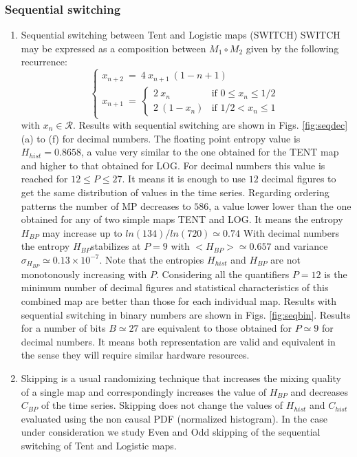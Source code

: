 \subsubsection{Sequential switching}
\begin{enumerate}
\item Sequential switching between Tent and Logistic maps (SWITCH)
SWITCH may be expressed as a composition between $M_1 \circ M_2$ given by the following recurrence:
%
\[ \left\{ \begin{array}{ccc}\label{eq:seq}
x_{n+2}~=~ 4~x_{n+1}~(1-{n+1}) \\
x_{n+1}~=~ \left\{ \begin{array}{ll}
2~{x_n} & \textrm{if $0\leq x_n\leq 1/2$}\\
2~(1-{x_n}) & \textrm{if $1/2<x_n\leq 1$} 
\end{array} \right.  \end{array}\right. \] 
with $x_n\in\mathcal{R}$.
%
Results with sequential switching are shown in Figs. \ref{fig:seqdec} (a) to (f) for decimal numbers. The floating point entropy value is $H_{hist}=0.8658$, a value very similar to the one obtained for the TENT map and higher to that obtained for LOG. For decimal numbers this value is reached for $12 \leq P \leq 27$. It means it is enough to use $12$ decimal figures to get the same distribution of values in the time series. Regarding ordering patterns the number of MP decreases to $586$, a value lower lower than the one obtained for any of two simple maps TENT and LOG. It means the entropy $H_{BP}$ may increase up to $ln(134)/ln(720)\simeq 0.74$ With decimal numbers the entropy $H_{BP} $stabilizes at $P=9$ with $<H_{BP}>\simeq 0.657$ and variance $\sigma_{H_{BP}} \simeq 0.13 \times 10^{-7}$. Note that the entropies $H_{hist}$ and $H_{BP}$ are not monotonously increasing with $P$.  Considering all the quantifiers $P=12$ is the minimum number of decimal figures and statistical characteristics of this combined map are better than those for each individual map.
%
Results with sequential switching in binary numbers are shown in Figs. \ref{fig:seqbin}. Results for a number of bits $B\simeq27$ are equivalent to those obtained for $P\simeq 9$ for decimal numbers. It means both representation are valid and equivalent in the sense they will require similar hardware resources. 
\item 
Skipping is a usual randomizing technique that increases the mixing quality of a single map and correspondingly increases the value of $H_{BP}$ and decreases $C_{BP} $ of the time series. Skipping does not change the values of $H_{hist}$ and $C_{hist}$ evaluated using the non causal PDF (normalized histogram)\cite{DeMicco2008}. In the case under consideration we study Even and Odd skipping of the sequential switching of Tent and Logistic maps.

\end{enumerate}
